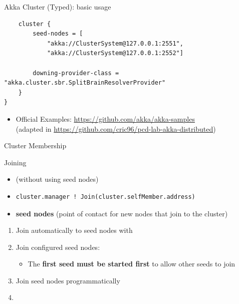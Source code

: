 \documentclass[presentation, 9pt]{beamer}\mode<presentation>{\usetheme{AMSBolognaFC}}
\begin{document}
\begin{frame}{Akka Cluster (Typed): basic usage}
\begin{tcolorbox}[left=0pt, top=0pt, bottom=0pt, title=Access the \textbf{Cluster} extension on a node]
\begin{verbatim}
	cluster {
		seed-nodes = [
			"akka://ClusterSystem@127.0.0.1:2551",
			"akka://ClusterSystem@127.0.0.1:2552"]

		downing-provider-class = "akka.cluster.sbr.SplitBrainResolverProvider"
	}
}
\end{verbatim}
\end{tcolorbox}
\begin{itemize}
	\item Official Examples: \url{https://github.com/akka/akka-samples} \\ (adapted in \url{https://github.com/cric96/pcd-lab-akka-distributed})
\end{itemize}

\end{frame}
\begin{frame}{Cluster Membership}
	\begin{alertblock}{Joining}
		\begin{itemize}
			\item {} (without using seed nodes)
			\item[] \begin{tcolorbox}[left=0pt, top=0pt, bottom=0pt]
				\begin{verbatim}
cluster.manager ! Join(cluster.selfMember.address)
				\end{verbatim}
			\end{tcolorbox}
			\item {} \textbf{seed nodes} (point of contact for new nodes that join to the cluster) \href{https://doc.akka.io/docs/akka/current/typed/cluster-concepts.html#seed-nodes}{\faLink}
		\end{itemize}
		\begin{enumerate}
			\item Join automatically to seed nodes with 
   		\item Join configured seed nodes: \\ 
			 \begin{itemize}
				\item The \textbf{first seed must be started first} to allow other seeds to join
		 \end{itemize}
			 \item Join seed nodes programmatically
		 	\item[] \begin{tcolorbox}[left=0pt, top=0pt, bottom=0pt]

\end{tcolorbox}
\end{enumerate}
\end{alertblock}
\end{frame}
\end{document}
